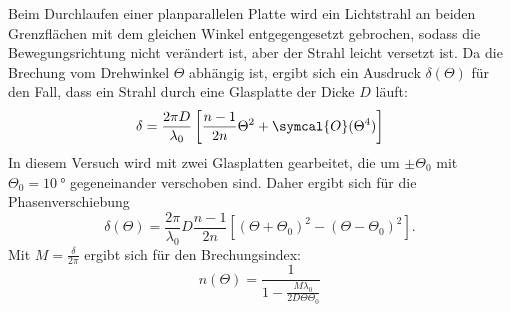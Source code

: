 \noindent Beim Durchlaufen einer planparallelen Platte wird ein Lichtstrahl an beiden Grenzflächen mit dem gleichen Winkel entgegengesetzt gebrochen, sodass die Bewegungsrichtung nicht
verändert ist, aber der Strahl leicht versetzt ist. Da die Brechung vom Drehwinkel $\Theta$ abhängig ist, ergibt sich ein Ausdruck $\delta(\Theta)$ für den Fall, dass ein Strahl durch 
eine Glasplatte der Dicke $D$ läuft:
\begin{equation*}
    \delta = \frac{2 \pi D}{\lambda_0} \left[ \frac{n-1}{2n} \Theta^2 + \symcal{O}(\Theta ^4)\right]
\end{equation*}
In diesem Versuch wird mit zwei Glasplatten gearbeitet, die um $ \pm \Theta_0$ mit $\Theta_0 = \SI{10}{\degree}$ gegeneinander verschoben sind. Daher ergibt 
sich für die Phasenverschiebung 
\begin{equation*}
    \delta(\Theta) = \frac{2 \pi}{\lambda_0} D \frac{n-1}{2n} \left[ (\Theta + \Theta_0)^2 - (\Theta - \Theta_0)^2 \right]. 
\end{equation*}
Mit $ M = \frac{\delta}{2 \pi} $ ergibt sich für den Brechungsindex:
\begin{equation}
    n(\Theta) = \frac{1}{1 - \frac{M \lambda_0}{2 D \Theta \Theta_0}}
    \label{eqn:n_Glas}
\end{equation}